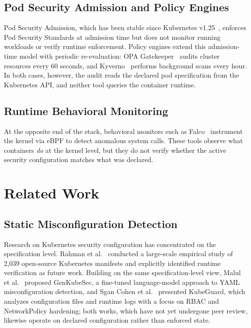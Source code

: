 \documentclass[sigconf]{acmart}
\begin{document}
\subsection{Pod Security Admission and Policy Engines}

Pod Security Admission, which has been stable since Kubernetes v1.25~\cite{k8spsa2022}, enforces Pod Security Standards at admission time but does not monitor running workloads or verify runtime enforcement. Policy engines extend this admission-time model with periodic re-evaluation: OPA Gatekeeper~\cite{gatekeeper2024} audits cluster resources every 60 seconds, and Kyverno~\cite{kyverno2024} performs background scans every hour. In both cases, however, the audit reads the declared pod specification from the Kubernetes API, and neither tool queries the container runtime.

\subsection{Runtime Behavioral Monitoring}

At the opposite end of the stack, behavioral monitors such as Falco~\cite{falco2024} instrument the kernel via eBPF to detect anomalous system calls. These tools observe what containers \emph{do} at the kernel level, but they do not verify whether the active security configuration matches what was declared.

\section{Related Work}

\subsection{Static Misconfiguration Detection}

Research on Kubernetes security configuration has concentrated on the specification level. Rahman et al.~\cite{rahman2023} conducted a large-scale empirical study of 2,039 open-source Kubernetes manifests and explicitly identified runtime verification as future work. Building on the same specification-level view, Malul et al.~\cite{malul2024} proposed GenKubeSec, a fine-tuned language-model approach to YAML misconfiguration detection, and Sgan Cohen et al.~\cite{sgancohen2025} presented KubeGuard, which analyzes configuration files and runtime logs with a focus on RBAC and NetworkPolicy hardening; both works, which have not yet undergone peer review, likewise operate on declared configuration rather than enforced state.
\end{document}
